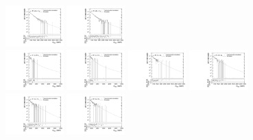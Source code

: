 \begin{figure}[htbp]
  \includegraphics[width=0.2\textwidth]{fig/analysisAppendix/templateVsReco_res_r0_MVV_mu_LP_nobb_LDy.pdf}
  \includegraphics[width=0.2\textwidth]{fig/analysisAppendix/templateVsReco_res_r0_MVV_e_LP_nobb_LDy.pdf}\\
  \includegraphics[width=0.2\textwidth]{fig/analysisAppendix/templateVsReco_res_r0_MVV_mu_HP_vbf_LDy.pdf}
  \includegraphics[width=0.2\textwidth]{fig/analysisAppendix/templateVsReco_res_r0_MVV_e_HP_vbf_LDy.pdf}
  \includegraphics[width=0.2\textwidth]{fig/analysisAppendix/templateVsReco_res_r0_MVV_mu_LP_vbf_LDy.pdf}
  \includegraphics[width=0.2\textwidth]{fig/analysisAppendix/templateVsReco_res_r0_MVV_e_LP_vbf_LDy.pdf}\\
  \includegraphics[width=0.2\textwidth]{fig/analysisAppendix/templateVsReco_res_r0_MVV_mu_HP_bb_HDy.pdf}
  \includegraphics[width=0.2\textwidth]{fig/analysisAppendix/templateVsReco_res_r0_MVV_e_HP_bb_HDy.pdf}

\end{figure}
